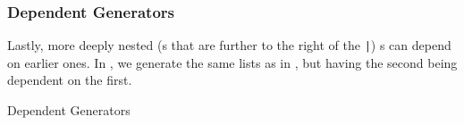 \subsubsection{Dependent Generators}\label{subsubsec:Dependent_Generators}
Lastly, more deeply nested (s that are further to the right of the \texttt{|}) s can depend on earlier ones.
In , we generate the same lists as in , but having the second  being dependent on the first.
\begin{listing}[h!tbp]
\caption{Dependent Generators}
\label{lst:Dependent_Generators}
\end{listing}

